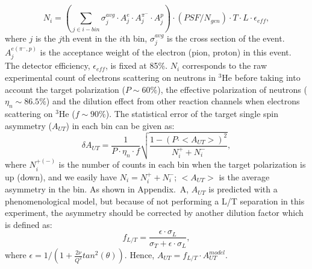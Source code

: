  \begin{equation}
     N_{i} = (\sum_{j\in i-bin} \sigma^{avg}_{j}\cdot A^{e}_{j} \cdot A^{\pi^{-}}_{j} \cdot A^{p}_{j}) \cdot (PSF/N_{gen}) \cdot T \cdot L \cdot \epsilon_{eff},
     \label{ncount}
 \end{equation}
 where $j$ is the $j$th event in the $i$th bin, $\sigma^{avg}_{j}$ is the cross section of the event. $A^{e(\pi^{-},p)}_{j}$ is the acceptance weight of the electron (pion, proton) in this event. The detector efficiency, $\epsilon_{eff}$, is fixed at 85\%. $N_{i}$ corresponds to the raw experimental count of electrons scattering on neutrons in $\mathrm{^{3}He}$ before taking into account the target polarization ($P\sim60\%$), the effective polarization of neutrons ($\eta_{n}\sim86.5\%$) and the dilution effect from other reaction channels when electrons scattering on $\mathrm{^{3}He}$ ($f \sim 90\%$). The statistical error of the target single spin asymmetry ($A_{UT}$) in each bin can be given as:
  \begin{equation}
    \delta A_{UT} = \frac{1}{P\cdot\eta_{n}\cdot f} \sqrt{\frac{1-(P\cdot <A_{UT}>)^{2}}{N^{+}_{i}+N^{-}_{i}}},
    \label{stat_err}
 \end{equation}
 where $N^{+(-)}_{i}$ is the number of counts in each bin when the target polarization is up (down), and we easily have $N_{i}=N^{+}_{i}+N^{-}_{i}$; $<A_{UT}>$ is the average asymmetry in the bin. As shown in Appendix.~A,  $A_{UT}$ is predicted with a phenomenological model, but because of not performing a L/T separation in this experiment, the asymmetry should be corrected by another dilution factor which is defined as:
\begin{equation}
  f_{L/T} =\frac{\epsilon\cdot\sigma_{L} }{\sigma_{T}+\epsilon\cdot\sigma_{L} },
\end{equation} 
where $\epsilon=1/(1+\frac{2\nu}{Q^{2}}tan^{2}(\theta))$. Hence, $A_{UT} = f_{L/T}\cdot A_{UT}^{model}$.

